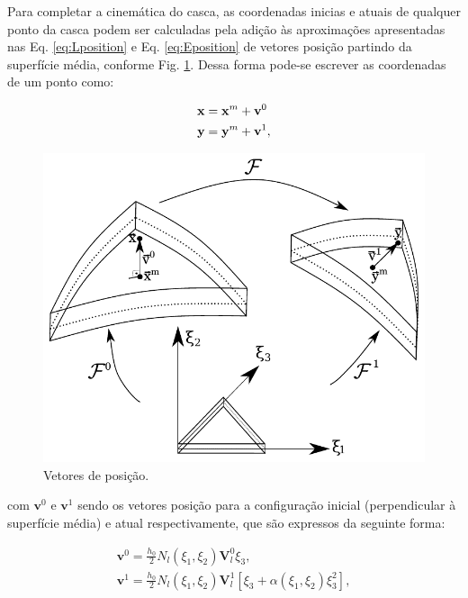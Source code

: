\documentclass[tese_patricia]{subfiles}
\begin{document}
Para completar a cinemática do casca, as coordenadas inicias e atuais de qualquer ponto da casca podem ser calculadas pela adição às aproximações apresentadas nas Eq. \eqref{eq:Lposition} e Eq. \eqref{eq:Eposition} de vetores posição partindo da superfície média, conforme Fig. \ref{fig:casca2}. Dessa forma pode-se escrever as coordenadas de um ponto como:

\begin{align}
\mathbf{x} &= \mathbf{x}^{m} + \mathbf{v}^{0}\\
\mathbf{y} &= \mathbf{y}^{m} + \mathbf{v}^{1},
\end{align}

\begin{figure}[htb!]
	\centering
	\includegraphics[scale=0.8,trim=0cm 0.0cm 0cm 0cm, clip=true]{Imagens/Cap4/genvec.pdf}	
	\caption{Vetores de posição.}
	\label{fig:casca2}
\end{figure}

\noindent com $\mathbf{v}^{0}$ e $\mathbf{v}^{1}$ sendo os vetores posição para a configuração inicial (perpendicular à superfície média) e atual respectivamente, que são expressos da seguinte forma:

\begin{align}
\mathbf{v}^{0} = \frac{h_{0}}{2}N_{l}\left(\xi_{1},\xi_{2}\right)\mathbf{V}_{l}^{0}\xi_{3},\\
\mathbf{v}^{1} = \frac{h_{0}}{2}N_{l}\left(\xi_{1},\xi_{2}\right)\mathbf{V}_{l}^{1}\left[\xi_{3} + \alpha\left(\xi_{1},\xi_{2}\right)\xi_{3}^2\right],
\end{align}
\end{document}
